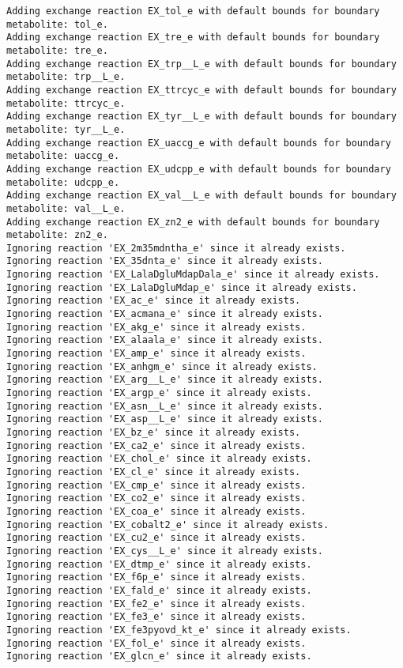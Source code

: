 \documentclass[
  letterpaper,
  DIV=11,
  numbers=noendperiod]{scrartcl}
\begin{document}
\begin{verbatim}
Adding exchange reaction EX_tol_e with default bounds for boundary metabolite: tol_e.
Adding exchange reaction EX_tre_e with default bounds for boundary metabolite: tre_e.
Adding exchange reaction EX_trp__L_e with default bounds for boundary metabolite: trp__L_e.
Adding exchange reaction EX_ttrcyc_e with default bounds for boundary metabolite: ttrcyc_e.
Adding exchange reaction EX_tyr__L_e with default bounds for boundary metabolite: tyr__L_e.
Adding exchange reaction EX_uaccg_e with default bounds for boundary metabolite: uaccg_e.
Adding exchange reaction EX_udcpp_e with default bounds for boundary metabolite: udcpp_e.
Adding exchange reaction EX_val__L_e with default bounds for boundary metabolite: val__L_e.
Adding exchange reaction EX_zn2_e with default bounds for boundary metabolite: zn2_e.
Ignoring reaction 'EX_2m35mdntha_e' since it already exists.
Ignoring reaction 'EX_35dnta_e' since it already exists.
Ignoring reaction 'EX_LalaDgluMdapDala_e' since it already exists.
Ignoring reaction 'EX_LalaDgluMdap_e' since it already exists.
Ignoring reaction 'EX_ac_e' since it already exists.
Ignoring reaction 'EX_acmana_e' since it already exists.
Ignoring reaction 'EX_akg_e' since it already exists.
Ignoring reaction 'EX_alaala_e' since it already exists.
Ignoring reaction 'EX_amp_e' since it already exists.
Ignoring reaction 'EX_anhgm_e' since it already exists.
Ignoring reaction 'EX_arg__L_e' since it already exists.
Ignoring reaction 'EX_argp_e' since it already exists.
Ignoring reaction 'EX_asn__L_e' since it already exists.
Ignoring reaction 'EX_asp__L_e' since it already exists.
Ignoring reaction 'EX_bz_e' since it already exists.
Ignoring reaction 'EX_ca2_e' since it already exists.
Ignoring reaction 'EX_chol_e' since it already exists.
Ignoring reaction 'EX_cl_e' since it already exists.
Ignoring reaction 'EX_cmp_e' since it already exists.
Ignoring reaction 'EX_co2_e' since it already exists.
Ignoring reaction 'EX_coa_e' since it already exists.
Ignoring reaction 'EX_cobalt2_e' since it already exists.
Ignoring reaction 'EX_cu2_e' since it already exists.
Ignoring reaction 'EX_cys__L_e' since it already exists.
Ignoring reaction 'EX_dtmp_e' since it already exists.
Ignoring reaction 'EX_f6p_e' since it already exists.
Ignoring reaction 'EX_fald_e' since it already exists.
Ignoring reaction 'EX_fe2_e' since it already exists.
Ignoring reaction 'EX_fe3_e' since it already exists.
Ignoring reaction 'EX_fe3pyovd_kt_e' since it already exists.
Ignoring reaction 'EX_fol_e' since it already exists.
Ignoring reaction 'EX_glcn_e' since it already exists.

\end{verbatim}
\end{document}
